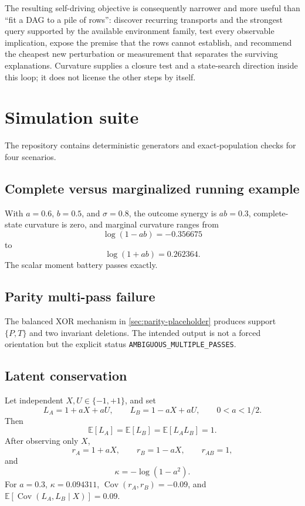 \documentclass[11pt]{article}
\newcommand{\E}{\mathbb{E}}
\newcommand{\Cov}{\operatorname{Cov}}
\begin{document}
The resulting self-driving objective is consequently narrower and more useful
than ``fit a DAG to a pile of rows'': discover recurring transports and the
strongest query supported by the available environment family, test every
observable implication, expose the premise that the rows cannot establish, and
recommend the cheapest new perturbation or measurement that separates the
surviving explanations.  Curvature supplies a closure test and a state-search
direction inside this loop; it does not license the other steps by itself.

\section{Simulation suite}

The repository contains deterministic generators and exact-population checks for four scenarios.

\subsection{Complete versus marginalized running example}

With \(a=0.6\), \(b=0.5\), and \(\sigma=0.8\), the outcome synergy is \(ab=0.3\), complete-state curvature is zero, and marginal curvature ranges from
\begin{equation}
\log(1-ab)=-0.356675
\end{equation}
to
\begin{equation}
\log(1+ab)=0.262364.
\end{equation}
The scalar moment battery passes exactly.

\subsection{Parity multi-pass failure}

The balanced XOR mechanism in \cref{sec:parity-placeholder} produces support \(\{P,T\}\) and two invariant deletions.  The intended output is not a forced orientation but the explicit status \texttt{AMBIGUOUS\_MULTIPLE\_PASSES}.

\subsection{Latent conservation}

Let independent \(X,U\in\{-1,+1\}\), and set
\begin{equation}
L_A=1+aX+aU,
\qquad
L_B=1-aX+aU,
\qquad 0<a<1/2.
\end{equation}
Then
\begin{equation}
\E[L_A]=\E[L_B]=\E[L_AL_B]=1.
\end{equation}
After observing only \(X\),
\begin{equation}
r_A=1+aX,
\qquad
r_B=1-aX,
\qquad
r_{AB}=1,
\end{equation}
and
\begin{equation}
\kappa=-\log(1-a^2).
\end{equation}
For \(a=0.3\), \(\kappa=0.094311\), \(\Cov(r_A,r_B)=-0.09\), and \(\E[\Cov(L_A,L_B\mid X)]=0.09\).
\end{document}

